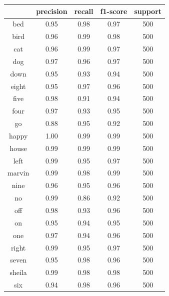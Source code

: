 \documentclass{bmvc2k}
\begin{document}
\begin{table}[ht]
\centering
\begin{tabular}{|c|c|c|c|c|}
\hline
             & precision  &  recall & f1-score &  support \\ \hline

         bed &      0.95  &    0.98  &    0.97 &      500 \\ \hline
        bird &      0.96  &    0.99  &    0.98 &      500 \\ \hline
         cat &      0.96  &    0.99  &    0.97 &      500 \\ \hline
         dog &      0.97  &    0.96  &    0.97 &      500 \\ \hline
        down &      0.95  &    0.93  &    0.94 &      500 \\ \hline
       eight &      0.95  &    0.97  &    0.96 &      500 \\ \hline
        five &      0.98  &    0.91  &    0.94 &      500 \\ \hline
        four &      0.97  &    0.93  &    0.95 &      500 \\ \hline
          go &      0.88  &    0.95  &    0.92 &      500 \\ \hline
       happy &      1.00  &    0.99  &    0.99 &      500 \\ \hline
       house &      0.99  &    0.99  &    0.99 &      500 \\ \hline
        left &      0.99  &    0.95  &    0.97 &      500 \\ \hline
      marvin &      0.99  &    0.98  &    0.99 &      500 \\ \hline
        nine &      0.96  &    0.95  &    0.96 &      500 \\ \hline
          no &      0.99  &    0.86  &    0.92 &      500 \\ \hline
         off &      0.98  &    0.93  &    0.96 &      500 \\ \hline
          on &      0.95  &    0.94  &    0.95 &      500 \\ \hline
         one &      0.97  &    0.94  &    0.96 &      500 \\ \hline
       right &      0.99  &    0.95  &    0.97 &      500 \\ \hline
       seven &      0.95  &    0.98  &    0.96 &      500 \\ \hline
      sheila &      0.99  &    0.98  &    0.98 &      500 \\ \hline
         six &      0.94  &    0.98  &    0.96 &      500 \\ \hline

\end{tabular}
\end{table}
\end{document}
